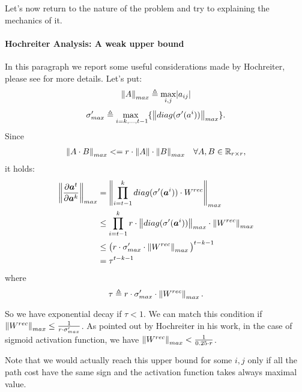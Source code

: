 Let's now return to the nature of the problem and try to explaining the mechanics of it.

\paragraph{Hochreiter Analysis: A weak upper bound}
In this paragraph we report some useful considerations made by Hochreiter, please see \cite{lstm} for more details.
Let's put:
$$\left\Vert A \right\Vert_{max}\triangleq \underset{i,j}{\text{max}}|a_{ij}| $$
$$\sigma'_{max} \triangleq \underset{i=k,...,t-1}{\text{max  }} \{\left\Vert diag(\sigma'(a^i)) \right\Vert_{max}\}.$$
Since
\begin{align}
\left\Vert A\cdot B \right\Vert_{max} &<= r \cdot \left\Vert A \right\Vert\cdot \left\Vert B \right\Vert_{max} & \forall A,B \in \mathbb{R}_{r\times r}, 
\end{align}
it holds:
\begin{align}
\left\Vert \frac{\partial \boldsymbol{a}^t}{\partial \boldsymbol{a}^k} \right\Vert_{max} &= \left\Vert  \prod_{i=t-1}^{k}  diag(\sigma'(\boldsymbol{a}^i)) \cdot W^{rec}  \right\Vert_{max}\\
&\leq \prod_{i=t-1}^{k} r \cdot \left\Vert diag(\sigma'(\boldsymbol{a}^i)) \right\Vert_{max} \cdot \left\Vert W^{rec} \right\Vert_{max}\\
&\leq \big(r \cdot \sigma'_{max} \cdot \left\Vert W^{rec} \right\Vert_{max}\big)^{t-k-1} \\
&= \tau^{t-k-1}
\end{align}
where $$\tau \triangleq r \cdot \sigma'_{max} \cdot \left\Vert W^{rec} \right\Vert_{max}.$$

So we have exponential decay if $\tau<1$. We can match this condition if $\left\Vert W^{rec} \right\Vert_{max} \leq \frac{1}{r\cdot \sigma'_{max}}$.
As pointed out by Hochreiter in his work, in the case of sigmoid activation function, we have $\left\Vert W^{rec} \right\Vert_{max} < \frac{1}{0.25 \cdot r}$.

Note that we would actually reach this upper bound for some $i,j$ only if all the path cost have the same sign and the activation function takes always maximal
value.
